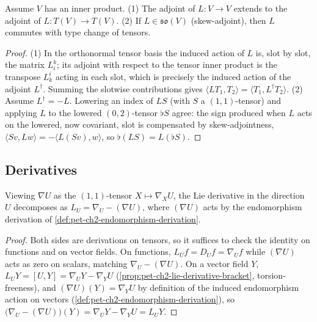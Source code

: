 \begin{proposition}
  \label{prop:pet-ch2-endomorphism-adjoint-type-change}
  \leanok
  Assume $V$ has an inner product. (1) The adjoint of $L:V\to V$ extends to
  the adjoint of $L:T(V)\to T(V)$. (2) If $L\in\mathfrak{so}(V)$ (skew-adjoint),
  then $L$ commutes with type change of tensors.
\end{proposition}
\begin{proof}
  \leanok
  (1) In the orthonormal tensor basis the induced action of $L$ is, slot by slot,
  the matrix $L^k_i$; its adjoint with respect to the tensor inner product is the
  transpose $L^i_k$ acting in each slot, which is precisely the induced action of
  the adjoint $L^\dagger$. Summing the slotwise contributions gives
  $\langle LT_1,T_2\rangle=\langle T_1,L^\dagger T_2\rangle$. (2) Assume
  $L^\dagger=-L$. Lowering an index of $LS$ (with $S$ a $(1,1)$-tensor) and
  applying $L$ to the lowered $(0,2)$-tensor $\flat S$ agree: the sign produced
  when $L$ acts on the lowered, now covariant, slot is compensated by
  skew-adjointness, $\langle Sv,Lw\rangle=-\langle L(Sv),w\rangle$, so
  $\flat(LS)=L(\flat S)$.
\end{proof}

\subsection{Derivatives}

\begin{proposition}
  \label{prop:pet-ch2-lie-derivative-as-endomorphism-derivation}
  \leanok
  Viewing $\nabla U$ as the $(1,1)$-tensor $X\mapsto\nabla_XU$, the Lie
  derivative in the direction $U$ decomposes as $L_U=\nabla_U-(\nabla U)$,
  where $(\nabla U)$ acts by the endomorphism derivation of
  \cref{def:pet-ch2-endomorphism-derivation}.
\end{proposition}
\begin{proof}
  \leanok
  Both sides are derivations on tensors, so it suffices to check the identity
  on functions and on vector fields. On functions, $L_Uf=D_Uf=\nabla_Uf$ while
  $(\nabla U)$ acts as zero on scalars, matching $\nabla_U-(\nabla U)$. On a
  vector field $Y$, $L_UY=[U,Y]=\nabla_UY-\nabla_YU$
  (\cref{prop:pet-ch2-lie-derivative-bracket}, torsion-freeness), and
  $(\nabla U)(Y)=\nabla_YU$ by definition of the induced endomorphism action
  on vectors (\cref{def:pet-ch2-endomorphism-derivation}), so
  $\big(\nabla_U-(\nabla U)\big)(Y)=\nabla_UY-\nabla_YU=L_UY$.
\end{proof}

